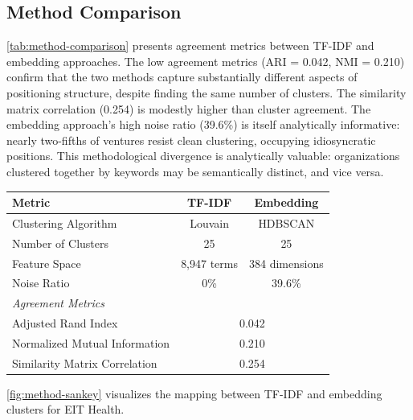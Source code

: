 \documentclass[../main.tex]{subfiles}
\begin{document}
\subsection{Method Comparison}

\cref{tab:method-comparison} presents agreement metrics between TF-IDF and embedding approaches. The low agreement metrics (ARI = 0.042, NMI = 0.210) confirm that the two methods capture substantially different aspects of positioning structure, despite finding the same number of clusters. The similarity matrix correlation (0.254) is modestly higher than cluster agreement. The embedding approach's high noise ratio (39.6\%) is itself analytically informative: nearly two-fifths of ventures resist clean clustering, occupying idiosyncratic positions. This methodological divergence is analytically valuable: organizations clustered together by keywords may be semantically distinct, and vice versa.

\begin{center}
\small
\begin{tabular}{lcc}
\toprule
\textbf{Metric} & \textbf{TF-IDF} & \textbf{Embedding} \\
\midrule
Clustering Algorithm & Louvain & HDBSCAN \\
Number of Clusters & 25 & 25 \\
Feature Space & 8,947 terms & 384 dimensions \\
Noise Ratio & 0\% & 39.6\% \\
\midrule
\multicolumn{3}{l}{\textit{Agreement Metrics}} \\
Adjusted Rand Index & \multicolumn{2}{c}{0.042} \\
Normalized Mutual Information & \multicolumn{2}{c}{0.210} \\
Similarity Matrix Correlation & \multicolumn{2}{c}{0.254} \\
\bottomrule
\end{tabular}
\end{center}

\cref{fig:method-sankey} visualizes the mapping between TF-IDF and embedding clusters for EIT Health.
\end{document}
